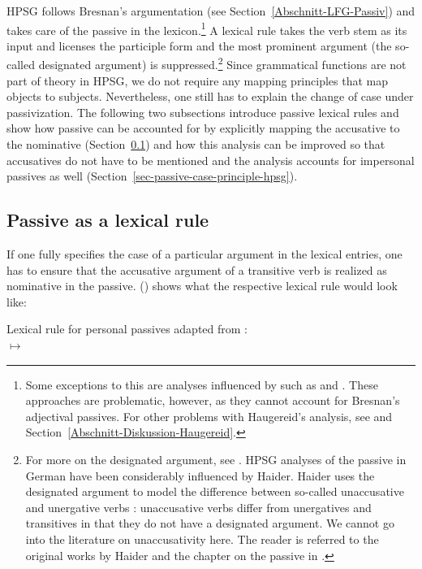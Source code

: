 HPSG follows Bresnan's argumentation (see Section~\ref{Abschnitt-LFG-Passiv}) and
takes care of the passive in the lexicon.\footnote{%
  Some exceptions to this are analyses influenced by \cxg such as \citet{Tseng2007a} and \citet{Haugereid2007a}.
  These approaches are problematic, however, as they cannot account for Bresnan's adjectival passives. For other problems with
  Haugereid's analysis, see  and Section~\ref{Abschnitt-Diskussion-Haugereid}.%
} 
A lexical rule takes the verb stem as its input and licenses the participle form
and the most prominent argument (the so-called designated argument) is
suppressed.\footnote{%
  For more on the designated argument, see . HPSG analyses of the passive in German
  have been considerably influenced by Haider. Haider uses the designated argument to model the
  difference between so-called unaccusative and unergative verbs \citep{Perlmutter78}: unaccusative
  verbs differ from unergatives and
  transitives in that they do not have a designated argument. We cannot go into
  the literature on unaccusativity here. The reader is referred to the original works by Haider and
  the chapter on the passive in .
}
Since grammatical functions are not part of theory in HPSG, we do not
require any mapping principles that map objects to subjects. Nevertheless, one still has to explain
the change of case under passivization. The following two subsections introduce passive lexical
rules and show how passive can be accounted for by explicitly mapping the accusative to the
nominative (Section~\ref{sec-passive-lr-acc-nom}) and how this analysis can be improved so that
accusatives do not have to be mentioned and the analysis accounts for impersonal passives as well
(Section~\ref{sec-passive-case-principle-hpsg}). 

\subsection{Passive as a lexical rule}
\label{sec-passive-lr-acc-nom}

If one fully specifies the case of a particular argument in
the lexical entries, one has to ensure that the accusative argument of a transitive verb is realized
as nominative in the passive. () shows what the respective lexical rule would look like:

\ea
\label{pass-lr-mlr}
Lexical rule for personal passives adapted from \citet{Kiss92}:\\[2pt]
 $\mapsto$ \\
\flushright{}
\z

